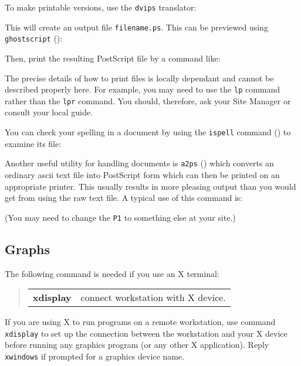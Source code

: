 \documentclass[twoside,11pt,nolof]{starlink}
\begin{document}
To make printable versions, use the \texttt{dvips} translator:
\begin{terminalv}
\end{terminalv}
This will create an output file \texttt{filename.ps}. This can be previewed
using \texttt{ghostscript}
():
\begin{terminalv}
\end{terminalv}
Then, print the resulting PostScript file by a command like:
\begin{terminalv}
\end{terminalv}
The precise details of how to print files is locally dependant and cannot
be described properly here.
For example, you may need to use the \texttt{lp} command rather than the
\texttt{lpr} command.
You should, therefore, ask your Site Manager or consult your local guide.

You can check your spelling in a document by using the \texttt{ispell} command
() to examine its file:
\begin{terminalv}
\end{terminalv}

Another useful utility for handling documents is \texttt{a2ps}
() which
converts an ordinary ascii text file into PostScript form which can then
be printed on an appropriate printer.
This usually results in more pleasing output than you would get from using the
raw text file.
A typical use of this command is:
\begin{terminalv}
\end{terminalv}
(You may need to change the \texttt{P1} to something else at your site.)

\subsection{Graphs}

The following command is needed if you use an X terminal:
\begin{quote}
\begin{tabular}{lp{67mm}}

\textbf{xdisplay}  & connect workstation with X device.

\end{tabular}
\end{quote}
If you are using X to run programs on a remote workstation, use command
\texttt{xdisplay} to set up the connection between the workstation and your X
device before running any graphics program (or any other X application).
Reply \texttt{xwindows} if prompted for a graphics device name.
\end{document}
